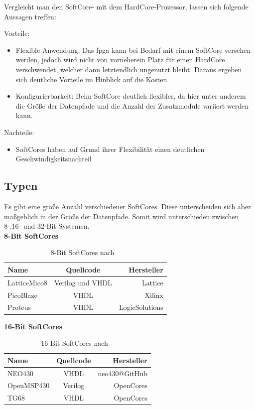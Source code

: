 Vergleicht man den SoftCore- mit dem HardCore-Prozessor, lassen sich folgende Aussagen treffen:

Vorteile:
\begin{itemize}
   \item Flexible Anwendung: Das \ac{fpga} kann bei Bedarf mit einem SoftCore versehen werden, jedoch wird nicht von vorneherein Platz für einen HardCore verschwendet, welcher
    dann letztendlich ungenutzt bleibt. Daraus ergeben sich deutliche Vorteile im Hinblick auf die Kosten.
    \item Konfigurierbarkeit: Beim SoftCore deutlich flexibler, da hier unter anderem die Größe der Datenpfade und die Anzahl der Zusatzmodule variiert werden kann.
 \end{itemize}


Nachteile:
\begin{itemize}
  \item SoftCores haben auf Grund ihrer Flexibilität einen deutlichen Geschwindigkeitsnachteil
\end{itemize}

\subsection{Typen}\label{kap:typen}
Es gibt eine große Anzahl verschiedener SoftCores. Diese unterscheiden sich aber maßgeblich in der Größe der Datenpfade.
Somit wird unterschieden zwischen 8-,16- und 32-Bit Systemen.\cite{softcore}\\

\textbf{8-Bit SoftCores}\\
\begin{table}[H]
\centering
\begin{tabular}{|l|c|r|}
  \hline
  \textbf{Name} & \textbf{Quellcode} & \textbf{Hersteller}\\
  \hline
  LatticeMico8 & Verilog und VHDL & Lattice\\
  \hline
  PicoBlaze & VHDL & Xilinx\\
  \hline
  Proteus & VHDL & LogicSolutions\\
  \hline
\end{tabular}
  \caption{8-Bit SoftCores nach ~\cite{softcore}}
 \label{tab:8bitsysteme}
  \end{table}

  \textbf{16-Bit SoftCores}\\
  \begin{table}[H]
  \centering
  \begin{tabular}{|l|c|r|}
    \hline
  \textbf{Name} & \textbf{Quellcode} & \textbf{Hersteller}\\
    \hline
    NEO430 & VHDL & neo430@GitHub\\
    \hline
    OpenMSP430 & Verilog & OpenCores\\
    \hline
    TG68 & VHDL & OpenCores\\
    \hline
  \end{tabular}
    \caption{16-Bit SoftCores nach ~\cite{softcore}}
   \label{tab:16bitsysteme}
    \end{table}

